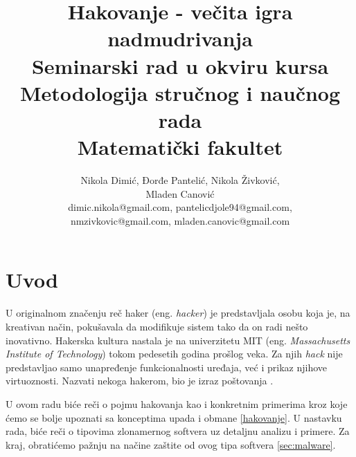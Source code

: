 \documentclass[a4paper]{article}
\begin{document}
\title{Hakovanje - večita igra nadmudrivanja\\ \small{Seminarski rad u okviru kursa\\Metodologija stručnog i naučnog rada\\ Matematički fakultet}}

\author{Nikola Dimić, Đorđe Pantelić, Nikola Živković,\\Mladen Canović\\ dimic.nikola@gmail.com, pantelicdjole94@gmail.com,\\nmzivkovic@gmail.com, mladen.canovic@gmail.com}


\maketitle


\setcounter{tocdepth}{2}
\tableofcontents

\newpage

\section{Uvod}
\label{sec:uvod}
U originalnom značenju reč haker (eng. \textit{hacker}) je predstavljala osobu koja je, na kreativan način, pokušavala da modifikuje sistem tako da on radi nešto inovativno. Hakerska kultura nastala je na univerzitetu MIT (eng. \textit{Massachusetts Institute of Technology}) tokom pedesetih godina prošlog veka. Za njih \textit{hack} nije predstavljao samo unapređenje funkcionalnosti uređaja, već i prikaz njihove virtuoznosti. Nazvati nekoga hakerom, bio je izraz poštovanja \cite{ethics}.

U ovom radu biće reči o pojmu hakovanja kao i konkretnim primerima kroz koje ćemo se bolje upoznati sa konceptima 
upada i obmane \ref{hakovanje}. U nastavku rada, biće reči o tipovima zlonamernog softvera uz detaljnu analizu i primere. Za kraj, obratićemo pažnju na načine zaštite od ovog tipa softvera \ref{sec:malware}.
\end{document}
